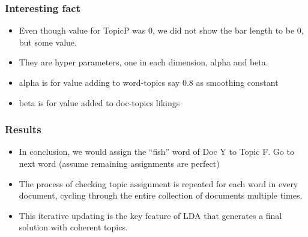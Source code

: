 \begin{frame}[fragile]\frametitle{Interesting fact}

  \begin{itemize}
	\item Even though value for TopicP was 0, we did not show the bar length to be 0, but some value.
	\item They are hyper parameters, one in each dimension, alpha and beta.
	\item alpha is for value adding to word-topics say 0.8 as smoothing constant
	\item beta is for value added to doc-topics likings
  \end{itemize}
  
\end{frame}
\begin{frame}[fragile]\frametitle{Results}
  \begin{itemize}
	\item In conclusion, we would assign the ``fish'' word of Doc Y to Topic F. Go to next word (assume remaining assignments are perfect)
  	\item   The process of checking topic assignment is repeated for each word in every document, cycling through the entire collection of documents multiple times. 
	\item This iterative updating is the key feature of LDA that generates a final solution with coherent topics.
  \end{itemize}
\end{frame}





